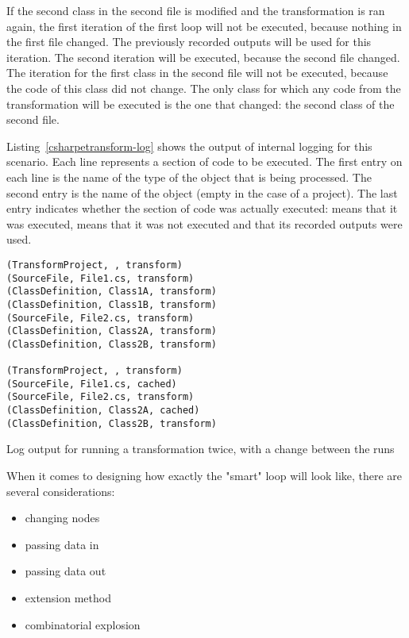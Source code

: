 If the second class in the second file is modified and the transformation is ran again, the first iteration of the first loop will not be executed, because nothing in the first file changed. The previously recorded outputs will be used for this iteration. The second iteration will be executed, because the second file changed. The iteration for the first class in the second file will not be executed, because the code of this class did not change. The only class for which any code from the transformation will be executed is the one that changed: the second class of the second file.

Listing~\ref{csharpetransform-log} shows the output of internal logging for this scenario. Each line represents a section of code to be executed. The first entry on each line is the name of the type of the object that is being processed. The second entry is the name of the object (empty in the case of a project). The last entry indicates whether the section of code was actually executed:  means that it was executed,  means that it was not executed and that its recorded outputs were used.

\begin{listing}
\begin{verbatim}
(TransformProject, , transform)
(SourceFile, File1.cs, transform)
(ClassDefinition, Class1A, transform)
(ClassDefinition, Class1B, transform)
(SourceFile, File2.cs, transform)
(ClassDefinition, Class2A, transform)
(ClassDefinition, Class2B, transform)

(TransformProject, , transform)
(SourceFile, File1.cs, cached)
(SourceFile, File2.cs, transform)
(ClassDefinition, Class2A, cached)
(ClassDefinition, Class2B, transform)
\end{verbatim}
\caption{Log output for running a transformation twice, with a change between the runs}
\label{csharpetransform-log}
\end{listing}

\medskip

When it comes to designing how exactly the "smart"  loop will look like, there are several considerations:

\begin{itemize}
\label{no-parent}
\item changing nodes
\item passing data in
\item passing data out
\item extension method
\item combinatorial explosion
\end{itemize}

